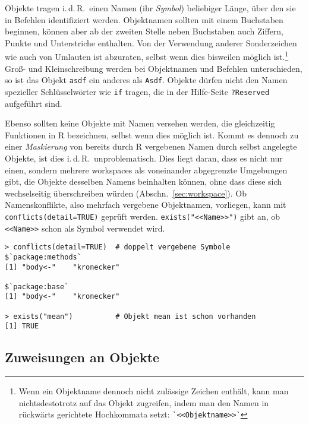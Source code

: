Objekte tragen i.\,d.\,R.\ einen Namen (ihr \emph{Symbol}) beliebiger Länge, über den sie in Befehlen identifiziert werden. Objektnamen sollten mit einem Buchstaben beginnen, können aber ab der zweiten Stelle neben Buchstaben auch Ziffern, Punkte und Unterstriche enthalten. Von der Verwendung anderer Sonderzeichen wie auch von Umlauten ist abzuraten, selbst wenn dies bisweilen möglich ist.\footnote{Wenn ein Objektname dennoch nicht zulässige Zeichen enthält, kann man nichtsdestotrotz auf das Objekt zugreifen, indem man den Namen in rückwärts gerichtete Hochkommata setzt: \lstinline!`<<Objektname>>`!} Groß- und Kleinschreibung werden bei Objektnamen und Befehlen unterschieden, so ist das Objekt \lstinline!asdf! ein anderes als \lstinline!Asdf!. Objekte dürfen nicht den Namen spezieller Schlüsselwörter wie \lstinline!if! tragen, die in der Hilfe-Seite \lstinline!?Reserved! aufgeführt sind.

Ebenso sollten keine Objekte mit Namen versehen werden, die gleichzeitig Funktionen in R bezeichnen, selbst wenn dies möglich ist. Kommt es dennoch zu einer \emph{Maskierung} von bereits durch R vergebenen Namen durch selbst angelegte Objekte, ist dies i.\,d.\,R.\ unproblematisch. Dies liegt daran, dass es nicht nur einen, sondern mehrere workspaces als voneinander abgegrenzte Umgebungen gibt, die Objekte desselben Namens beinhalten können, ohne dass diese sich wechselseitig überschreiben würden (Abschn.\ \ref{sec:workspace}). Ob Namenskonflikte, also mehrfach vergebene Objektnamen, vorliegen, kann mit \lstinline!conflicts(detail=TRUE)! geprüft werden.  \lstinline!exists("<<Name>>")! gibt an, ob \lstinline!<<Name>>! schon als Symbol verwendet wird.
\begin{lstlisting}
> conflicts(detail=TRUE)  # doppelt vergebene Symbole
$`package:methods`
[1] "body<-"    "kronecker"

$`package:base`
[1] "body<-"    "kronecker"

> exists("mean")          # Objekt mean ist schon vorhanden
[1] TRUE
\end{lstlisting}

\subsection{Zuweisungen an Objekte}

